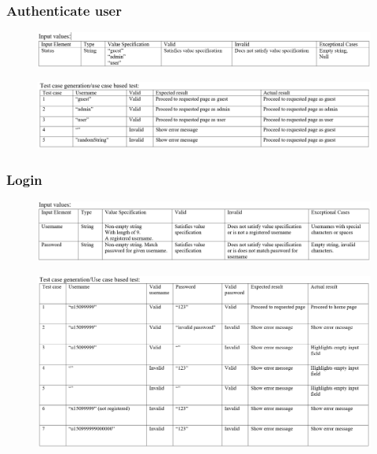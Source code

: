 \documentclass[english]{article}
\begin{document}
\subsubsection{Authenticate user}
\begin{figure}[ht!]
\hspace*{-2.5cm}
\includegraphics[width=180mm]{1.png}
\end{figure}
\begin{figure}[ht!]
\hspace*{-2.5cm}
\includegraphics[width=180mm]{2.png}
\end{figure}
\subsubsection{Login}
\begin{figure}[H]
\hspace*{-2.5cm}
\includegraphics[width=180mm]{3.png}
\end{figure}
\begin{figure}[H]
\hspace*{-2.5cm}
\includegraphics[width=180mm]{4.png}
\end{figure}
\end{document}
